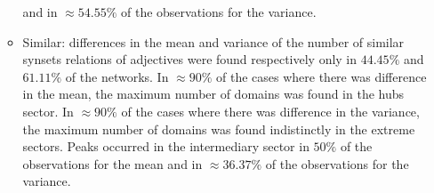 \begin{itemize}
\begin{itemize}
																																																																																																																																																																																																							and in $\approx 54.55\%$ of the observations for the variance.
																																																																																																																																																																																																										\item Similar:
																																																																																																																																																																																																														differences in the mean and variance of the number of similar synsets relations of adjectives were found respectively only in $44.45\%$ and $61.11\%$ of the networks.
																																																																																																																																																																																																																		In $\approx 90\%$ of the cases where there was difference in the mean, 
																																																																																																																																																																																																																						the maximum number of domains was found in the hubs sector.
																																																																																																																																																																																																																										In $\approx 90\%$ of the cases where there was difference in the variance, 
																																																																																																																																																																																																																														the maximum number of domains was found indistinctly in the extreme sectors.
																																																																																																																																																																																																																																		Peaks occurred in the intermediary sector in $50\%$ of the observations for the mean
																																																																																																																																																																																																																																						and in $\approx 36.37\%$ of the observations for the variance.

\end{itemize}
\end{itemize}

